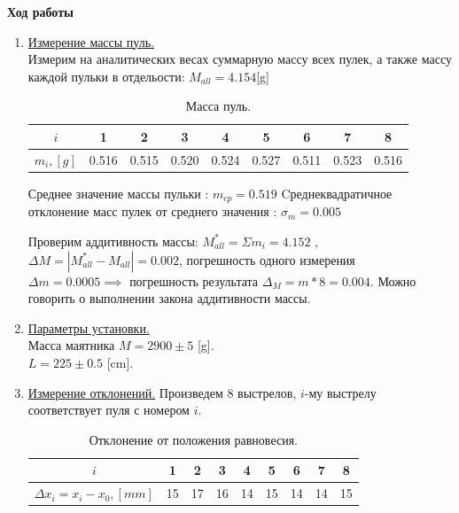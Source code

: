 \documentclass[11pt]{article}
\begin{document}
    \textbf{Ход работы}
    \begin{enumerate} 
    \item \underline{Измерение массы пуль.} \\
        \indent Измерим на аналитических весах суммарную массу всех пулек, а также массу каждой пульки в отдельости:
        $M_{all} = 4.154$[g] \\

        \begin{table}[h]
                    \caption{Масса пуль.}
                    \begin{center}
                    \begin{tabular}{|c|c|c|c|c|c|c|c|c|}
                            \hline 
                                $i$ & 1 & 2 & 3 & 4 & 5 & 6 & 7 & 8 \\
                            \hline
                                $m_i , [g]$ & 0.516& 0.515& 0.520& 0.524& 0.527& 0.511& 0.523& 0.516\\
                            \hline
                            \end{tabular}
                        \end{center}
        \end{table}

        Среднее значение массы пульки : $m_{cp} = 0.519$
        Cреднеквадратичное отклонение масс пулек от среднего значения : $\sigma_{m} = 0.005$


        Проверим аддитивность массы: $M^*_{all} = \Sigma m_{i} = 4.152$ , $\Delta M = |M^*_{all} - M_{all}| = 0.002$, погрешность одного измерения $\Delta m = 0.0005 \implies$ погрешность результата $\Delta_M = m * 8 = 0.004$. Можно говорить о выполнении закона аддитивности массы.

    \item \underline{Параметры установки.} \\
        Масса маятника $M = 2900 \pm 5$ [g]. \\
        $L = 225 \pm 0.5$ [cm].
    \item \underline{Измерение отклонений.}
        Произведем 8 выстрелов, $i$-му выстрелу соответствует пуля с номером $i$.
        \begin{table}[h]
                    \caption{Отклонение от положения равновесия.}
                    \begin{center}
                    \begin{tabular}{|c|c|c|c|c|c|c|c|c|}
                            \hline 
                                $i$ & 1 & 2 & 3 & 4 & 5 & 6 & 7 & 8 \\
                            \hline
                                $\Delta x_i = x_i - x_0 , [mm]$ &15&17&16&14&15&14&14&15\\
                            \hline
                            \end{tabular}
                        \end{center}
        \end{table}


\end{enumerate}
\end{document}
